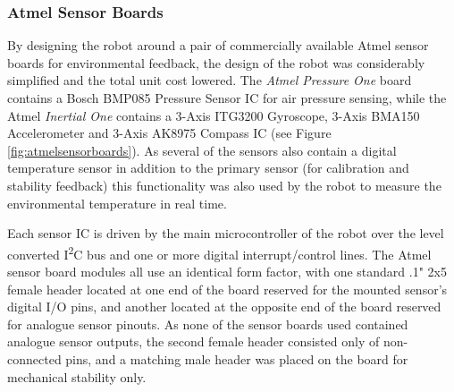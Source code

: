 \subsubsection{Atmel Sensor Boards}

By designing the robot around a pair of commercially available Atmel sensor boards for environmental feedback, the design of the robot was considerably simplified and the total unit cost lowered. The \textit{Atmel Pressure One} board contains a Bosch BMP085 Pressure Sensor IC for air pressure sensing, while the Atmel \textit{Inertial One} contains a 3-Axis ITG3200 Gyroscope, 3-Axis BMA150 Accelerometer and 3-Axis AK8975 Compass IC (see Figure \ref{fig:atmelsensorboards}). As several of the sensors also contain a digital temperature sensor in addition to the primary sensor (for calibration and stability feedback) this functionality was also used by the robot to measure the environmental temperature in real time.

Each sensor IC is driven by the main microcontroller of the robot over the level converted I\textsuperscript{2}C bus and one or more digital interrupt/control lines. The Atmel sensor board modules all use an identical form factor, with one standard .1" 2x5 female header located at one end of the board reserved for the mounted sensor's digital I/O pins, and another located at the opposite end of the board reserved for analogue sensor pinouts. As none of the sensor boards used contained analogue sensor outputs, the second female header consisted only of non-connected pins, and a matching male header was placed on the board for mechanical stability only.

